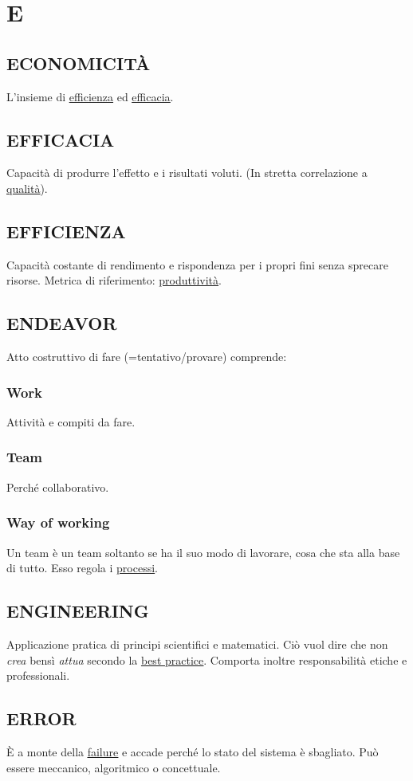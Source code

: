 \newpage
	\section{E} \label{sec:E}
	
		\subsection{ECONOMICITÀ}  \label{economicita}
		L'insieme di \underline{\hyperref[efficienza]{efficienza}} ed \underline{\hyperref[efficacia]{efficacia}}.
		
		\subsection{EFFICACIA}  \label{efficacia}
		Capacità di produrre l'effetto e i risultati voluti. (In stretta correlazione a \underline{\hyperref[qualita]{qualità}}).
		
		\subsection{EFFICIENZA}  \label{efficienza}
		Capacità costante di rendimento e rispondenza per i propri fini senza sprecare risorse. Metrica di riferimento: \underline{\hyperref[produttivita]{produttività}}.
		
		\subsection{ENDEAVOR}  \label{endeavor}
		Atto costruttivo di fare (=tentativo/provare) comprende:
			\subsubsection{Work} \label{work}
			Attività e compiti da fare.
			\subsubsection{Team} \label{team}
			Perché collaborativo.
			\subsubsection{Way of working}	\label{way}
			Un team è un team soltanto se ha il suo modo di lavorare, cosa che sta alla base di tutto. Esso regola i \underline{\hyperref[processo]{processi}}.
		
		\subsection{ENGINEERING}  \label{engineering}
		Applicazione pratica di principi scientifici e matematici. Ciò vuol dire che non \textit{crea} bensì \textit{attua} secondo la \underline{\hyperref[best]{best practice}}. Comporta inoltre responsabilità etiche e professionali.
		
		\subsection{ERROR}		\label{error}
		È a monte della \underline{\hyperref[failure]{failure}} e accade perché lo stato del sistema è sbagliato. Può essere meccanico, algoritmico o concettuale.
	
	
